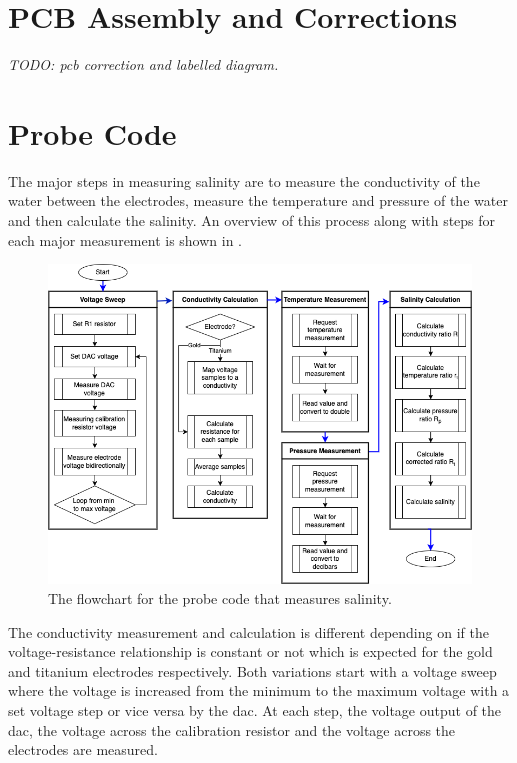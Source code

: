 \section{PCB Assembly and Corrections}

\textit{TODO: pcb correction and labelled diagram.}

\section{Probe Code}

The major steps in measuring salinity are to measure the conductivity of the water between the electrodes, measure the temperature and pressure of the water and then calculate the salinity.
An overview of this process along with steps for each major measurement is shown in .

\begin{figure}[h]
    \centering
    \includegraphics[width=1\textwidth]{Figures/probe_flowchart}
    \caption{The flowchart for the probe code that measures salinity.}
    \label{fig:probe-code-flowchart} %
\end{figure}

The conductivity measurement and calculation is different depending on if the voltage-resistance relationship is constant or not which is expected for the gold and titanium electrodes respectively.
Both variations start with a voltage sweep where the voltage is increased from the minimum to the maximum voltage with a set voltage step or vice versa by the \gls{dac}.
At each step, the voltage output of the \gls{dac}, the voltage across the calibration resistor and the voltage across the electrodes are measured.

